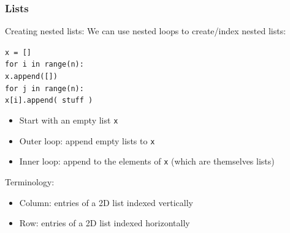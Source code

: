 \documentclass{beamer}
\newcommand{\code}[1]{\texttt{#1}}
\newcommand{\tab}{\hspace*{22pt}}
\begin{document}
\begin{frame}
	\frametitle{Lists}
	
	\begin{block}{Creating nested lists:}
		We can use nested loops to create/index nested lists:
		
		\vspace{10pt}
			\code{x = [] \\
			for i in range(n): \\
			\tab x.append([]) \\
			\tab for j in range(n): \\
			\tab \tab x[i].append( stuff ) 
			}
		\endminipage\hfill
			\begin{itemize}
				\item Start with an empty list \code{x}
				\item Outer loop: append empty lists to \code{x}
				\item Inner loop: append to the elements of \code{x} (which are themselves lists)
			\end{itemize}
		\endminipage\hfill
		
		\vspace{15pt}
		Terminology:
		\begin{itemize}
			\item Column: entries of a 2D list indexed vertically
			\item Row: entries of a 2D list indexed horizontally
		\end{itemize}
	\end{block}
	
\end{frame}
\end{document}
